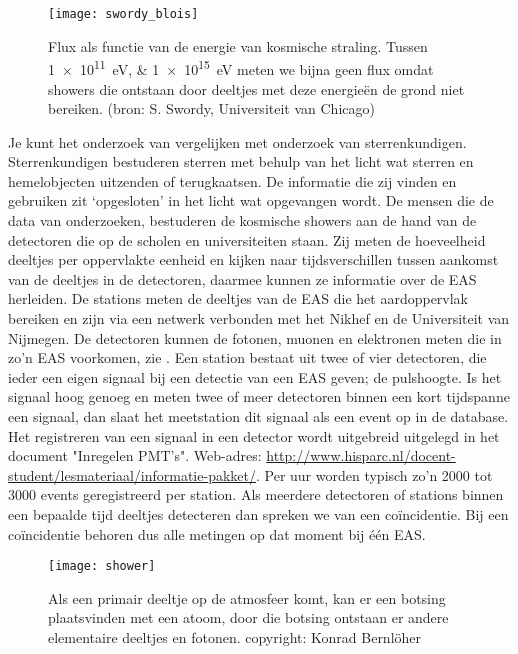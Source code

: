 \begin{figure}
    \centering
    \texttt{[image: swordy\_blois]}
    \caption{Flux als functie van de energie van kosmische straling. Tussen
             \SIlist{1e11;1e15}{\electronvolt} meten we bijna geen flux omdat
             showers die ontstaan door deeltjes met deze energieën de grond
             niet bereiken. (bron: S. Swordy, Universiteit van Chicago)}
    \label{fig:swordy_blois}
\end{figure}

Je kunt het onderzoek van \hisparc vergelijken met onderzoek van
sterrenkundigen. Sterrenkundigen bestuderen sterren met behulp van het
licht wat sterren en hemelobjecten uitzenden of terugkaatsen. De
informatie die zij vinden en gebruiken zit ‘opgesloten’ in het licht wat
opgevangen wordt. De mensen die de data van \hisparc onderzoeken,
bestuderen de kosmische showers aan de hand van de detectoren die op de
scholen en universiteiten staan. Zij meten de hoeveelheid deeltjes per
oppervlakte eenheid en kijken naar tijdsverschillen tussen aankomst van
de deeltjes in de detectoren, daarmee kunnen ze informatie over de EAS
herleiden. De \hisparc stations meten de deeltjes van de EAS die
het aardoppervlak bereiken en zijn via een netwerk verbonden met het
Nikhef en de Universiteit van Nijmegen. De \hisparc detectoren kunnen
de fotonen, muonen en elektronen meten die in zo’n EAS voorkomen, zie .
Een station bestaat uit twee of vier detectoren, die ieder
een eigen signaal bij een detectie van een EAS geven; de pulshoogte. Is
het signaal hoog genoeg en meten twee of meer detectoren binnen een kort
tijdspanne een signaal, dan slaat het meetstation dit signaal als een
event op in de database. Het registreren van een signaal in een detector wordt
uitgebreid uitgelegd in het document "Inregelen PMT's".
Web-adres: \url{http://www.hisparc.nl/docent-student/lesmateriaal/informatie-pakket/}.
Per uur worden typisch zo’n 2000 tot 3000
events geregistreerd per station. Als meerdere detectoren of stations
binnen een bepaalde tijd deeltjes detecteren dan spreken we van een
coïncidentie. Bij een coïncidentie behoren dus alle metingen op dat
moment bij één EAS.

\begin{figure}
    \centering
    \texttt{[image: shower]}
    \caption{Als een primair deeltje op de atmosfeer komt, kan er een botsing
             plaatsvinden met een atoom, door die botsing ontstaan er andere
             elementaire deeltjes en fotonen. copyright: Konrad Bernlöher}
    \label{fig:shower}
\end{figure}

